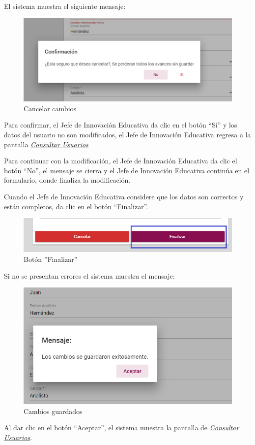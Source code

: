 El sistema muestra el siguiente mensaje:
\clearpage
\begin{figure}[H]
	\centering
	\includegraphics[width=0.4\linewidth]{images/SP5/MSG29}
	\caption{Cancelar cambios}
	\label{mensaje29-JIE}

\end{figure}

Para confirmar, el Jefe de Innovación Educativa da clic en el botón “Sí” y los datos del usuario no son modificados, el Jefe de Innovación Educativa regresa a la pantalla \hyperlink{consultarUs-JIE}{\textit{Consultar Usuarios}}

Para continuar con la modificación, el Jefe de Innovación Educativa  da clic el botón “No”, el mensaje se cierra y el Jefe de Innovación Educativa continúa en el formulario, donde finaliza la modificación.

Cuando el Jefe de Innovación Educativa considere que los datos son correctos y están completos, da clic en el botón “Finalizar”.
\begin{figure}[H]
	\centering
	\hypertarget{btnfin-JIE}{\includegraphics[width=0.7\linewidth]{images/SP5/BtnFinalizar}}
	\caption{Botón ''Finalizar''}
	\label{btnfin-JIE}
\end{figure}

Si no se presentan errores el sistema muestra el mensaje:

\begin{figure}[H]
	\centering
	\includegraphics[width=0.4\linewidth]{images/SP5/MSG31}
	\caption{Cambios guardados}
	\label{mensaje31-JIE}

\end{figure}

Al dar clic en el botón “Aceptar”, el sistema muestra la pantalla de \hyperlink{consultarUs-JIE}{\textit{Consultar Usuarios}}.

